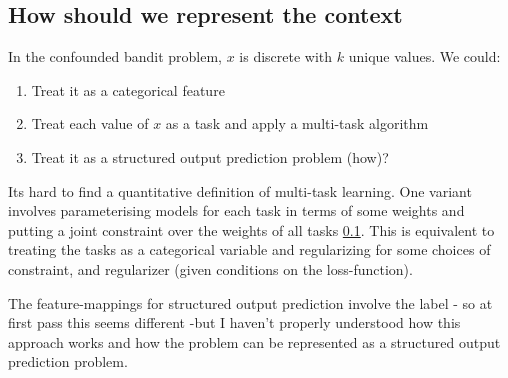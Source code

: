\documentclass{article}
\theoremstyle{plain}
\theoremstyle{definition}
\begin{document}
\subsection{How should we represent the context} 
In the confounded bandit problem, $x$ is discrete with $k$ unique values. We could:
\begin{enumerate}
\item Treat it as a categorical feature
\item Treat each value of $x$ as a task and apply a multi-task algorithm
\item Treat it as a structured output prediction problem (how)?
\end{enumerate}

Its hard to find a quantitative definition of multi-task learning. One variant involves parameterising models for each task in terms of some weights and putting a joint constraint over the weights of all tasks \ref{}. This is equivalent to treating the tasks as a categorical variable and regularizing for some choices of constraint, and regularizer (given conditions on the loss-function). 

The feature-mappings for structured output prediction involve the label - so at first pass this seems different -but I haven't properly understood how this approach works and how the problem can be represented as a structured output prediction problem.



\end{document}
